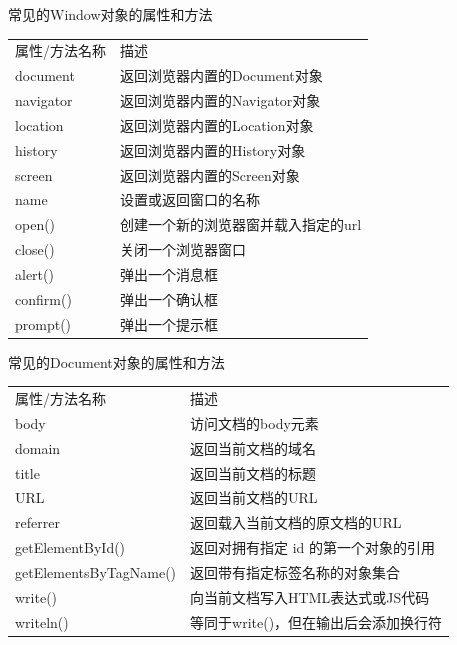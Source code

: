 \begin{frame}[fragile]{常见的Window对象的属性和方法}
\begin{table}[!hbp] 
\begin{tabular}{l|l}
\Xhline{1.3pt}
属性/方法名称 & 描述  \\ \Xhline{1.3pt}
document & 返回浏览器内置的Document对象 \\ \hline
navigator & 返回浏览器内置的Navigator对象 \\ \hline
location & 返回浏览器内置的Location对象 \\ \hline
history & 返回浏览器内置的History对象 \\ \hline
screen & 返回浏览器内置的Screen对象 \\ \hline
name & 设置或返回窗口的名称 \\ \hline
open() & 创建一个新的浏览器窗并载入指定的url \\ \hline
close() & 关闭一个浏览器窗口 \\ \hline
alert() & 弹出一个消息框 \\ \hline
confirm() & 弹出一个确认框 \\ \hline
prompt() & 弹出一个提示框 \\ \hline
\end{tabular}
\end{table}
\end{frame}


\begin{frame}[fragile]{常见的Document对象的属性和方法}
\begin{table}[!hbp] 
\begin{tabular}{l|l}
\Xhline{1.3pt}
属性/方法名称 & 描述  \\ \Xhline{1.3pt}
body & 访问文档的body元素 \\ \hline
domain & 返回当前文档的域名 \\ \hline
title & 返回当前文档的标题 \\ \hline
URL & 返回当前文档的URL \\ \hline
referrer & 返回载入当前文档的原文档的URL \\ \hline
getElementById() & 返回对拥有指定 id 的第一个对象的引用 \\ \hline
getElementsByTagName() & 返回带有指定标签名称的对象集合 \\ \hline
write() & 向当前文档写入HTML表达式或JS代码 \\ \hline
writeln() & 等同于write()，但在输出后会添加换行符 \\ \hline
\end{tabular}
\end{table}
\end{frame}


